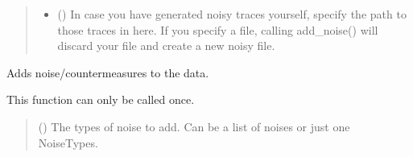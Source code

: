 \documentclass[letterpaper,10pt,english]{sphinxmanual}
\begin{document}
\begin{fulllineitems}
\begin{fulllineitems}
\begin{quote}
\begin{description}
\begin{itemize}
\item {} 
\sphinxAtStartPar
{} (\sphinxstyleliteralemphasis{\sphinxupquote{, }}) \textendash{} In case you have generated noisy traces yourself, specify the path to those traces in here.
If you specify a file, calling add\_noise() will discard your file and create a new noisy file.

\end{itemize}

\end{description}\end{quote}

\end{fulllineitems}


\begin{fulllineitems}
\label{\detokenize{MLSCAlib.Data:MLSCAlib.Data.custom_manager.CustomDataManager.add_noise}}
\pysigstartsignatures
{}
\pysigstopsignatures
\sphinxAtStartPar
Adds noise/countermeasures to the data.

\sphinxAtStartPar
This function can only be called once.
\begin{quote}\begin{description}
\sphinxAtStartPar
{} ({\hyperref[\detokenize{MLSCAlib.Data:MLSCAlib.Data.custom_manager.NoiseTypes}]{}}\sphinxstyleliteralemphasis{\sphinxupquote{, }}\sphinxstyleliteralemphasis{\sphinxupquote{{[}}}{\hyperref[\detokenize{MLSCAlib.Data:MLSCAlib.Data.custom_manager.NoiseTypes}]{\sphinxcrossref{\sphinxstyleliteralemphasis{\sphinxupquote{NoiseTypes}}}}}\sphinxstyleliteralemphasis{\sphinxupquote{{]}}}) \textendash{} The types of noise to add. Can be a list of noises or just one NoiseTypes.

\end{description}\end{quote}

\end{fulllineitems}


\end{fulllineitems}
\end{document}
